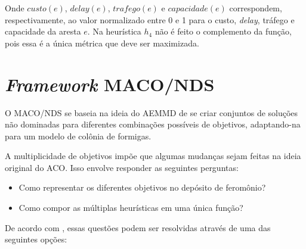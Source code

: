Onde $custo(e)$, $delay(e)$, $trafego(e)$ e $capacidade(e)$ correspondem, respectivamente, ao valor normalizado entre 0 e 1 para o custo, \textit{delay}, tráfego e capacidade da aresta $e$. Na heurística $h_4$ não é feito o complemento da função, pois essa é a única métrica que deve ser maximizada.

\section{\textit{Framework} MACO/NDS}
\label{section_algoritmo_framework}

O MACO/NDS se baseia na ideia do AEMMD de se criar conjuntos de soluções não dominadas para diferentes combinações possíveis de objetivos, adaptando-na para um modelo de colônia de formigas.

A multiplicidade de objetivos impõe que algumas mudanças sejam feitas na ideia original do ACO. Isso envolve responder as seguintes perguntas:

\begin{itemize}
	\item Como representar os diferentes objetivos no depósito de feromônio?
	\item Como compor as múltiplas heurísticas em uma única função?
\end{itemize}

De acordo com \cite{Alaya2007}, essas questões podem ser resolvidas através de uma das seguintes opções:

